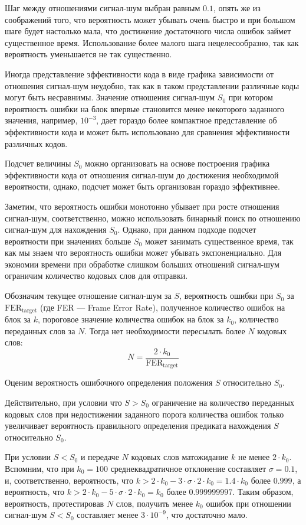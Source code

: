 Шаг между отношениями сигнал-шум выбран равным $0.1$,
опять же из соображений того, что вероятность может убывать
очень быстро и при большом шаге будет настолько мала, что
достижение достаточного числа ошибок займет существенное время.
Использование более малого шага нецелесообразно, так как
вероятность уменьшается не так существенно.

Иногда представление эффективности кода в виде графика зависимости
от отношения сигнал-шум неудобно, так как в таком представлении различные
коды могут быть несравнимы. Значение отношения сигнал-шум $S_0$ при котором вероятность
ошибки на блок впервые становится менее некоторого заданного значения, например, $10^{-3}$,
дает гораздо более компактное представление об эффективности кода и может быть использовано
для сравнения эффективности различных кодов.

Подсчет величины $S_0$ можно организовать на основе построения графика эффективности
кода от отношения сигнал-шум до достижения необходимой вероятности, однако, подсчет
может быть организован гораздо эффективнее.

Заметим, что вероятность ошибки монотонно убывает при росте отношения сигнал-шум,
соответственно, можно использовать бинарный поиск по отношению сигнал-шум для нахождения
$S_0$. Однако, при данном подходе подсчет вероятности при значениях больше $S_0$ может
занимать существенное время, так как мы знаем что вероятность ошибки может убывать экспоненциально.
Для экономии времени при обработке слишком больших отношений сигнал-шум ограничим количество
кодовых слов для отправки. 

\newcommand{\fertarget}{\text{FER}_{\text{target}}}

Обозначим текущее отношение сигнал-шум за $S$, вероятность ошибки
при $S_0$ за $\fertarget$ (где FER --- Frame Error Rate), полученное количество ошибок на блок
за $k$, пороговое значение количества ошибок
на блок за $k_0$, количество переданных слов за $N$. Тогда нет необходимости пересылать
более $N$ кодовых слов:
\[
	N = \frac{2 \cdot k_0}{\fertarget}
\]

Оценим вероятность ошибочного определения положения $S$ относительно $S_0$.

Действительно, при условии что $S > S_0$ ограничение на количество переданных кодовых слов
при недостижении заданного порога количества ошибок только увеличивает вероятность правильного определения
предиката нахождения $S$ относительно $S_0$. 

При условии $S < S_0$ и передаче $N$ кодовых слов 
матожидание $k$ не менее $2 \cdot k_0$. Вспомним, что при $k_0=100$ среднеквадратичное отклонение 
составляет $\sigma=0.1$,
и, соответственно, вероятность, что $k > 2 \cdot k_0 - 3 \cdot \sigma \cdot 2 \cdot k_0 = 1.4 \cdot k_0$
 более $0.999$, а вероятность, что $k > 2 \cdot k_0 - 5 \cdot \sigma \cdot 2 \cdot k_0 = k_0$ более $0.999999997$.
Таким образом, вероятность, протестировав $N$ слов, получить менее $k_0$ ошибок при отношении сигнал-шум
$S < S_0$ составляет менее $3 \cdot 10^{-9}$, что достаточно мало.

